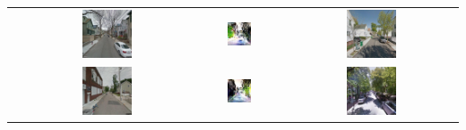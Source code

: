 \begin{table}
\begin{tabular}{l*3{C}@{}}
		& \includegraphics[width=0.3\textwidth]{Plot/examples/u_7} & \includegraphics[width=0.3\textwidth]{Plot/examples/t_7} &  \includegraphics[width=0.3\textwidth]{Plot/examples/b_7} \\ 
		& \includegraphics[width=0.3\textwidth]{Plot/examples/u_8} & \includegraphics[width=0.3\textwidth]{Plot/examples/t_8} &  \includegraphics[width=0.3\textwidth]{Plot/examples/b_8} \\ 

\end{tabular}
\end{table}
